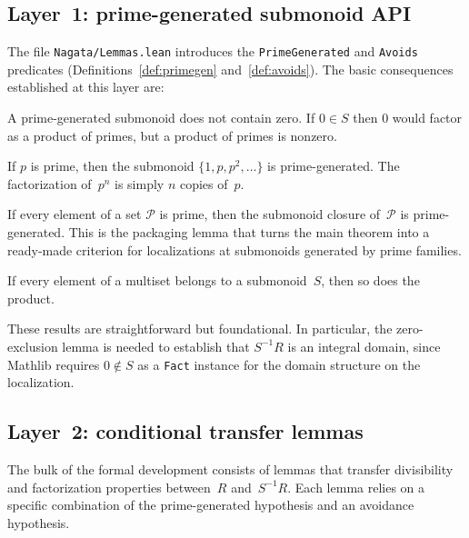 \documentclass[11pt]{article}
\theoremstyle{plain}
\theoremstyle{definition}
\theoremstyle{remark}
\newcommand{\li}[1]{\texorpdfstring{\texttt{#1}}{#1}}
\newcommand{\lf}[1]{\texorpdfstring{\nolinkurl{#1}}{#1}}
\begin{document}
\subsection{Layer~1: prime-generated submonoid API}\label{sec:layer1}

The file \lf{Nagata/Lemmas.lean} introduces the \li{PrimeGenerated} and
\li{Avoids} predicates (Definitions~\ref{def:primegen}
and~\ref{def:avoids}).  The basic consequences established at this layer are:

\begin{description}[nosep,leftmargin=1em,style=nextline]
\item[\li{zero\_notMem\_of\_primeGenerated}.]
  A prime-generated submonoid does not contain zero.  If $0\in S$ then $0$
  would factor as a product of primes, but a product of primes is nonzero.

\item[\li{primeGenerated\_powers}.]
  If $p$ is prime, then the submonoid $\{1,p,p^2,\ldots\}$ is
  prime-generated.  The factorization of~$p^n$ is simply $n$ copies of~$p$.

\item[\li{primeGenerated\_closure\_of\_primes}.]
  If every element of a set $\mathcal{P}$ is prime, then the submonoid
  closure of~$\mathcal{P}$ is prime-generated.  This is the packaging lemma
  that turns the main theorem into a ready-made criterion for localizations at
  submonoids generated by prime families.

\item[\li{multiset\_prod\_mem\_of\_factors}.]
  If every element of a multiset belongs to a submonoid~$S$, then so does
  the product.
\end{description}

\noindent
These results are straightforward but foundational.  In particular, the
zero-exclusion lemma is needed to establish that $S^{-1}R$ is an integral
domain, since Mathlib requires $0\notin S$ as a \li{Fact} instance for the
domain structure on the localization.


\subsection{Layer~2: conditional transfer lemmas}\label{sec:layer2}

The bulk of the formal development consists of lemmas that transfer
divisibility and factorization properties between~$R$ and~$S^{-1}R$.  Each
lemma relies on a specific combination of the prime-generated hypothesis and an
avoidance hypothesis.
\end{document}
